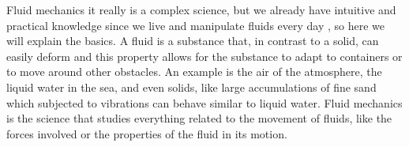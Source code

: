 
Fluid mechanics 
it really is a complex science, but we already have intuitive and practical knowledge since we live and manipulate fluids every day 
, so here we will
explain the basics.
A fluid is a substance that, in contrast to a solid, can easily deform and this property allows for the substance to adapt to containers or to move around other obstacles. An example is the air of the atmosphere, the liquid water in the sea, and even solids, like large accumulations of fine sand which subjected to vibrations can behave similar to liquid water.
Fluid mechanics is the science that studies everything related to the movement of fluids, like the forces involved or the properties of the fluid in its motion.

